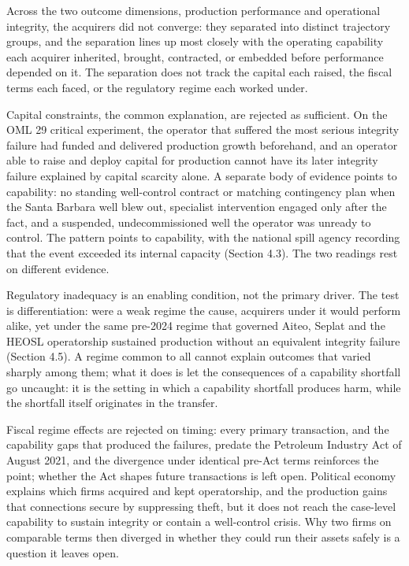 Across the two outcome dimensions, production performance and
operational integrity, the acquirers did not converge: they separated
into distinct trajectory groups, and the separation lines up most
closely with the operating capability each acquirer inherited, brought,
contracted, or embedded before performance depended on it. The
separation does not track the capital each raised, the fiscal terms each
faced, or the regulatory regime each worked under.

Capital constraints, the common explanation, are rejected as sufficient.
On the OML 29 critical experiment, the operator that suffered the most
serious integrity failure had funded and delivered production growth
beforehand, and an operator able to raise and deploy capital for
production cannot have its later integrity failure explained by capital
scarcity alone. A separate body of evidence points to capability: no
standing well-control contract or matching contingency plan when the
Santa Barbara well blew out, specialist intervention engaged only after
the fact, and a suspended, undecommissioned well the operator was
unready to control. The pattern points to capability, with the national
spill agency recording that the event exceeded its internal capacity
(Section 4.3). The two readings rest on different evidence.

Regulatory inadequacy is an enabling condition, not the primary driver.
The test is differentiation: were a weak regime the cause, acquirers
under it would perform alike, yet under the same pre-2024 regime that
governed Aiteo, Seplat and the HEOSL operatorship sustained production
without an equivalent integrity failure (Section 4.5). A regime common
to all cannot explain outcomes that varied sharply among them; what it
does is let the consequences of a capability shortfall go uncaught: it
is the setting in which a capability shortfall produces harm, while the
shortfall itself originates in the transfer.

Fiscal regime effects are rejected on timing: every primary transaction,
and the capability gaps that produced the failures, predate the
Petroleum Industry Act of August 2021, and the divergence under
identical pre-Act terms reinforces the point; whether the Act shapes
future transactions is left open. Political economy explains which firms
acquired and kept operatorship, and the production gains that
connections secure by suppressing theft, but it does not reach the
case-level capability to sustain integrity or contain a well-control
crisis. Why two firms on comparable terms then diverged in whether they
could run their assets safely is a question it leaves open.

